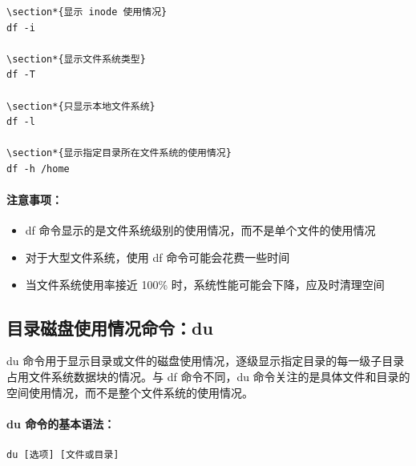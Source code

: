 \documentclass[12pt,UTF8]{ctexbook}
\begin{document}
\begin{verbatim}
\section*{显示 inode 使用情况}
df -i

\section*{显示文件系统类型}
df -T

\section*{只显示本地文件系统}
df -l

\section*{显示指定目录所在文件系统的使用情况}
df -h /home
\end{verbatim}

\paragraph{注意事项：}
\begin{itemize}
    \item df 命令显示的是文件系统级别的使用情况，而不是单个文件的使用情况
    \item 对于大型文件系统，使用 df 命令可能会花费一些时间
    \item 当文件系统使用率接近 100\% 时，系统性能可能会下降，应及时清理空间
\end{itemize}

\subsection{目录磁盘使用情况命令：du}
\label{du\_command}

du 命令用于显示目录或文件的磁盘使用情况，逐级显示指定目录的每一级子目录占用文件系统数据块的情况。与 df 命令不同，du 命令关注的是具体文件和目录的空间使用情况，而不是整个文件系统的使用情况。

\paragraph{du 命令的基本语法：}
\begin{verbatim}
du [选项] [文件或目录]
\end{verbatim}
\end{document}
